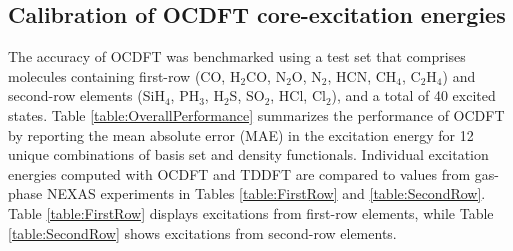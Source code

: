 \documentclass[12pt]{article}
\begin{document}
\subsection{Calibration of OCDFT core-excitation energies}
The accuracy of OCDFT was benchmarked using a test set that comprises molecules containing first-row (CO, H$_2$CO, N$_2$O, N$_2$, HCN, CH$_4$, C$_2$H$_4$) and second-row elements (SiH$_4$, PH$_3$, H$_2$S, SO$_2$, HCl, Cl$_2$), and a total of 40 excited states. 
Table \ref{table:OverallPerformance} summarizes the performance of OCDFT by reporting the mean absolute error (MAE) in the excitation energy for 12 unique combinations of basis set and density functionals.
Individual excitation energies computed with OCDFT and TDDFT are compared to values from gas-phase NEXAS experiments \cite{puttner_vibrationally_1999,remmers_high-resolution_1992,chen_k-shell_1989,tronc_nitrogen_1980,tronc_carbon_1979,francis_studies_1994,adachi_vibronic_1999,hitchcock_k-shell_1979,domke_carbon_1990,nayandin_angle-resolved_2001,bodeur_single-and_1990,gedat_s_1998,hudson_high-resolution_1994,cavell_chemical_1999,bodeur_photoabsorption_1985} in Tables \ref{table:FirstRow} and \ref{table:SecondRow}. Table \ref{table:FirstRow} displays excitations from first-row elements, while Table \ref{table:SecondRow} shows excitations from second-row elements.
\end{document}
